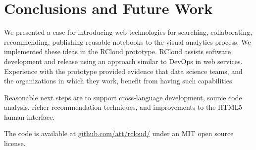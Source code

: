 \section{Conclusions and Future Work}

We presented a case for introducing web technologies
for searching, collaborating, recommending, publishing
reusable notebooks to the visual analytics process.
We implemented these ideas in the RCloud prototype.
RCloud assists software development and release using
an approach similar to DevOps in web services.
Experience with the prototype provided evidence that
data science teams, and the organizations in which they work,
benefit from having such capabilities.

Reasonable next steps are to support cross-language development,
source code analysis, richer recommendation techniques, and
improvements to the HTML5 human interface.

The code is available 
at \url{github.com/att/rcloud/}
under an MIT open source license.

